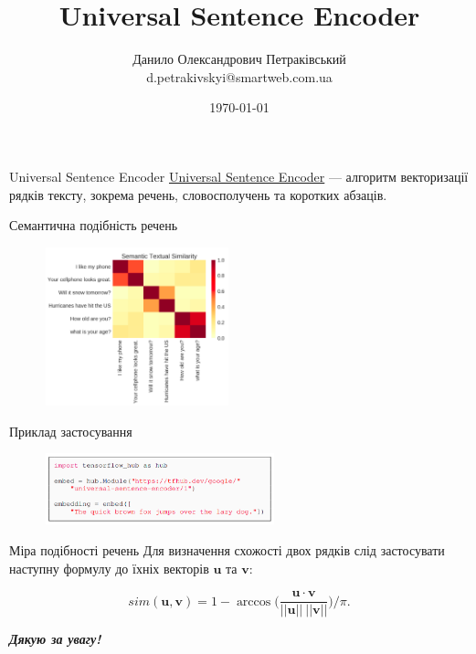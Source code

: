 \documentclass[mathserif]{beamer}
\title{Universal Sentence Encoder}
\institute{prom.ua}
\author[Д.О.~Петраківський]{Данило Олександрович Петраківський \\ d.petrakivskyi@smartweb.com.ua}
\date{\today}
\begin{document}
    \frame{\titlepage}

    \begin{frame}{Universal Sentence Encoder}
        \href{https://arxiv.org/abs/1803.11175}{Universal Sentence Encoder} --- алгоритм векторизації рядків тексту,
        зокрема речень, словосполучень та коротких абзаців.
    \end{frame}

    \begin{frame}{Семантична подібність речень}
        \begin{figure}[h!]
            \centering
            \includegraphics[width=200px]{images/use-sts}
        \end{figure}
    \end{frame}

    \begin{frame}{Приклад застосування}
        \begin{figure}[h!]
            \centering
            \includegraphics[width=250px]{images/use-code}
        \end{figure}
    \end{frame}

    \begin{frame}{Міра подібності речень}
        Для визначення схожості двох рядків слід застосувати наступну формулу до їхніх векторів $\boldsymbol{u}$ та
        $\boldsymbol{v}$:

        \[
            sim(\boldsymbol{u}, \boldsymbol{v})
            = 1
            - \arccos \biggl(\frac{\boldsymbol{u} \cdot \boldsymbol{v}}{||\boldsymbol{u}|| \ ||\boldsymbol{v}||}\biggr) / \pi.
        \]
    \end{frame}

    \begin{frame}
        \begin{center}
            \Huge \bfseries \itshape Дякую за увагу!
        \end{center}
    \end{frame}
\end{document}
